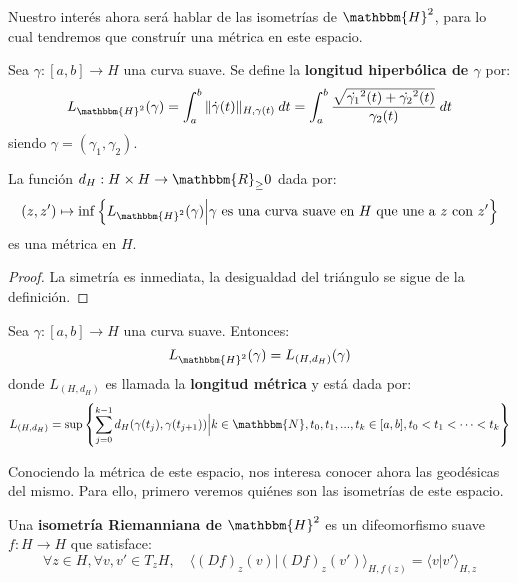 \documentclass[12pt]{report}
\newcounter{it}
\theoremstyle{largebreak}
\newcommand\cf[3]{\ensuremath{#1:#2\rightarrow#3}}
\newcommand{\bbm}[1]{\ensuremath{\mathbbm{#1}}}
\newcommand{\pint}[2]{\langle#1\big|#2 \rangle}
\newcommand{\norm}[1]{\|#1\|}
\begin{document}
    Nuestro interés ahora será hablar de las isometrías de $\bbm{H}^2$, para lo cual tendremos que construír una métrica en este espacio.
    
    \begin{mydef}
        Sea $\cf{\gamma}{[a,b]}{H}$ una curva suave. Se define la \textbf{longitud hiperbólica de $\gamma$} por:
        \begin{equation*}
            L_{\bbm{H}^2}(\gamma)=\int_{a}^{b}\norm{\dot{\gamma}(t)}_{ H,\gamma(t)}\:dt=\int_{a}^{b}\frac{\sqrt{\dot{\gamma_1}^2(t)+\dot{\gamma_2}^2(t)}}{\gamma_2(t)}\:dt
        \end{equation*}
        siendo $\gamma=(\gamma_1,\gamma_2)$.
    \end{mydef}

    \begin{propo}
        La función $\cf{d_H}{H\times H}{\bbm{R}_\geq0}$ dada por:
        \begin{equation*}
            (z,z')\mapsto\inf\left\{L_{\bbm{H}^2}(\gamma)\Big|\gamma\textup{ es una curva suave en $H$ que une a $z$ con $z'$} \right\}
        \end{equation*}
        es una métrica en $H$.
    \end{propo}

    \begin{proof}
        La simetría es inmediata, la desigualdad del triángulo se sigue de la definición.
    \end{proof}

    \begin{propo}
        Sea $\cf{\gamma}{[a,b]}{H}$ una curva suave. Entonces:
        \begin{equation*}
            L_{\bbm{H}^2}(\gamma)=L_{(H,d_H)}(\gamma)
        \end{equation*}
        donde $L_{(H,d_H)}$ es llamada la \textbf{longitud métrica} y está dada por:
        \begin{equation*}
            L_{(H,d_H)}=\sup\left\{\sum_{ j=0}^{k-1}d_H(\gamma(t_j),\gamma(t_{j+1}))\Big|k\in\bbm{N}, t_0,t_1,...,t_k\in[a,b], t_0<t_1<\cdots <t_k \right\}
        \end{equation*}
    \end{propo}

    Conociendo la métrica de este espacio, nos interesa conocer ahora las geodésicas del mismo. Para ello, primero veremos quiénes son las isometrías de este espacio.

    \begin{mydef}
        Una \textbf{isometría Riemanniana de $\bbm{H}^2$} es un difeomorfismo suave $\cf{f}{H}{H}$ que satisface:
        \begin{equation*}
            \forall z\in H, \forall v,v'\in T_zH,\quad\pint{(Df)_z(v)}{(Df)_z(v')}_{H,f(z)}=\pint{v}{v'}_{H,z}
        \end{equation*}
    \end{mydef}
\end{document}
